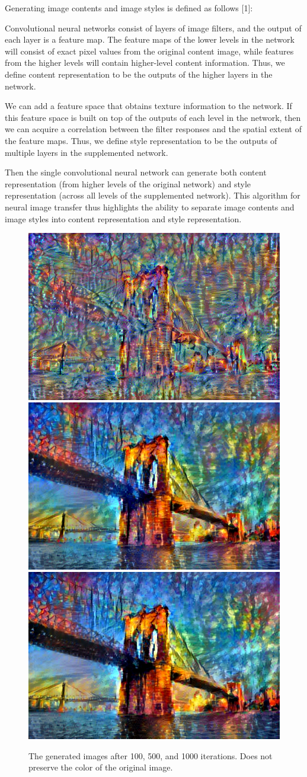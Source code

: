 \documentclass[10pt,twocolumn,letterpaper]{article}
\begin{document}
Generating image contents and image styles is defined as follows [1]:

Convolutional neural networks consist of layers of image filters, and the output of each layer is a feature map. The feature maps of the lower levels in the network will consist of exact pixel values from the original content image, while features from the higher levels will contain higher-level content information. Thus, we define content representation to be the outputs of the higher layers in the network.

We can add a feature space that obtains texture information to the network. If this feature space is built on top of the outputs of each level in the network, then we can acquire a correlation between the filter responses and the spatial extent of the feature maps. Thus, we define style representation to be the outputs of multiple layers in the supplemented network. 

Then the single convolutional neural network can generate both content representation (from higher levels of the original network) and style representation (across all levels of the supplemented network). This algorithm for neural image transfer thus highlights the ability to separate image contents and image styles into content representation and style representation. 

\begin{figure}
\begin{center}
\includegraphics[width=0.3\linewidth]{painted_bridge/out_100.png}
\includegraphics[width=0.3\linewidth]{painted_bridge/out_500.png}
\includegraphics[width=0.3\linewidth]{painted_bridge/out.png}
\end{center}
   \caption{The generated images after 100, 500, and 1000 iterations. Does not preserve the color of the original image.}
\label{fig:short}
\end{figure}
\end{document}
